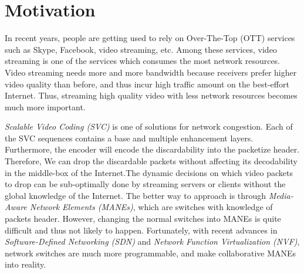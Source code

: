 \section{Motivation} \label{sec:motivation}

In recent years, people are getting used to rely on Over-The-Top (OTT) 
services such as Skype, Facebook, video streaming, etc. 
Among these services, video streaming is one of the services which 
consumes the most network resources. Video streaming needs more and more bandwidth because receivers prefer higher video quality than before, and thus incur high traffic amount on the best-effort Internet. Thus, streaming high quality video with less network resources becomes much more important.

{\em Scalable Video Coding (SVC) }is one of solutions for network congestion. Each of the SVC sequences contains a base and multiple enhancement layers. Furthermore, the encoder will encode the discardability into the packetize header. Therefore, We can drop the discardable packets without affecting its decodability in the middle-box of the Internet.The dynamic decisions on which video packets to drop can be sub-optimally done by streaming servers or clients without the global knowledge of the Internet. The better way to approach is through {\em Media-Aware Network Elements (MANEs)}, which are switches with knowledge of packets header. However, changing the normal switches into MANEs is quite difficult and thus not likely to happen. Fortunately, with recent advances in {\em Software-Defined Networking (SDN)} and {\em Network Function Virtualization (NVF)}, network switches are much more programmable, and make collaborative MANEs into reality. 




